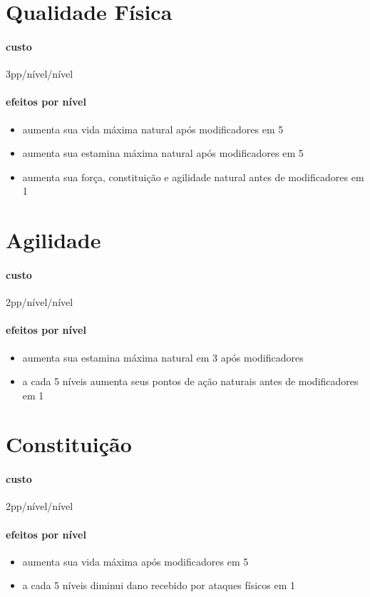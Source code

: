 \section{Qualidade Física}
\paragraph{custo} 3pp/nível/nível
\paragraph{efeitos por nível}
\begin{itemize}
    \item aumenta sua vida máxima natural após modificadores em 5
    \item aumenta sua estamina máxima natural após modificadores em 5
    \item aumenta sua força, constituição e agilidade natural antes de modificadores em 1
\end{itemize}
%
%
\section{Agilidade}
\paragraph{custo} 2pp/nível/nível
\paragraph{efeitos por nível}
\begin{itemize}
  \item aumenta sua estamina máxima natural em 3 após modificadores
  \item a cada 5 níveis aumenta seus pontos de ação naturais antes de modificadores em 1
\end{itemize}
%
%
\section{Constituição}
\paragraph{custo} 2pp/nível/nível
\paragraph{efeitos por nível}
\begin{itemize}
  \item aumenta sua vida máxima após modificadores em 5
  \item a cada 5 níveis diminui dano recebido por ataques físicos em 1
\end{itemize}
%
%
